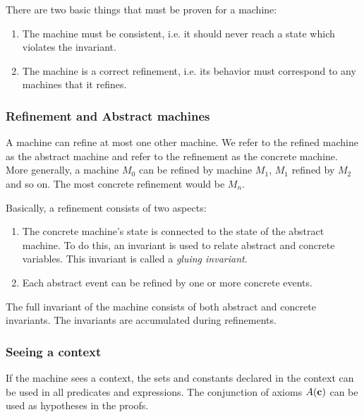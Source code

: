 There are two basic things that must be proven for a machine:
\begin{enumerate}
	\item The machine must be consistent, i.e. it should never reach a state which violates the invariant.
	\item The machine is a correct refinement, i.e. its behavior must correspond to any machines that it refines.
\end{enumerate}

\subsubsection{Refinement and Abstract machines}
\label{abstract_machine}

A machine can refine at most one other machine. 
We refer to the refined machine as the abstract machine and refer to the refinement as the concrete machine. 
More generally, a machine $M_0$ can be refined by machine $M_1$, $M_1$ refined by $M_2$ 
and so on. The most concrete refinement would be $M_n$. 

Basically, a refinement consists of two aspects:
\begin{enumerate}
	\item The concrete machine's state is connected to the state of the
      abstract machine. To do this, an invariant is used to relate abstract and concrete variables. 
      This invariant is called a \emph{gluing invariant}. 
	\item Each abstract event can be refined by one or more
concrete events.
\end{enumerate}

The full invariant of the machine consists of both abstract and concrete invariants. 
The invariants are accumulated during refinements.


\subsubsection{Seeing a context}
\label{seeing_a_context}
If the machine sees a context, the sets and constants declared in the context can be used in
 all predicates and expressions.
The conjunction of axioms $A(\mathbf{c})$ can be used as hypotheses in the proofs.

